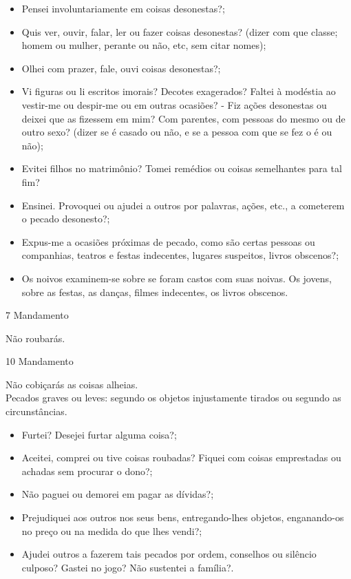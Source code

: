 \documentclass{book}
\begin{document}
\begin{itemize}
    \item Pensei involuntariamente em coisas desonestas?;
    \item Quis ver, ouvir, falar, ler ou fazer coisas desonestas? (dizer com que classe; homem ou mulher, perante ou não, etc, sem citar nomes);
    \item Olhei com prazer, fale, ouvi coisas desonestas?;
    \item Vi figuras ou li escritos imorais? Decotes exagerados? Faltei à modéstia ao vestir-me ou despir-me ou em outras ocasiões? - Fiz ações desonestas ou deixei que as fizessem em mim? Com parentes, com pessoas do mesmo ou de outro sexo? (dizer se é casado ou não, e se a pessoa com que se fez o é ou não);
    \item Evitei filhos no matrimônio? Tomei remédios ou coisas semelhantes para tal fim?
    \item Ensinei. Provoquei ou ajudei a outros por palavras, ações, etc., a cometerem o pecado desonesto?;
    \item Expus-me a ocasiões próximas de pecado, como são certas pessoas ou companhias, teatros e festas indecentes, lugares suspeitos, livros obscenos?;
    \item Os noivos examinem-se sobre se foram castos com suas noivas. Os jovens, sobre as festas, as danças, filmes indecentes, os livros obscenos.
\end{itemize}
\newpage
\begin{center}
    7\textordmasculine{} Mandamento
\end{center}
\begin{flushleft}
    Não roubarás.
\end{flushleft}
\begin{center}
    10\textordmasculine{} Mandamento
\end{center}
\begin{flushleft}
    Não cobiçarás as coisas alheias. \\
    \hfill{} \break{}
    Pecados graves ou leves: segundo os objetos injustamente tirados ou segundo as circunstâncias.
\end{flushleft}
\begin{itemize}
    \item Furtei? Desejei furtar alguma coisa?;
    \item Aceitei, comprei ou tive coisas roubadas? Fiquei com coisas emprestadas ou achadas sem procurar o dono?;
    \item Não paguei ou demorei em pagar as dívidas?;
    \item Prejudiquei aos outros nos seus bens, entregando-lhes objetos, enganando-os no preço ou na medida do que lhes vendi?;
    \item Ajudei outros a fazerem tais pecados por ordem, conselhos ou silêncio culposo? Gastei no jogo? Não sustentei a família?.
\end{itemize}
\end{document}
